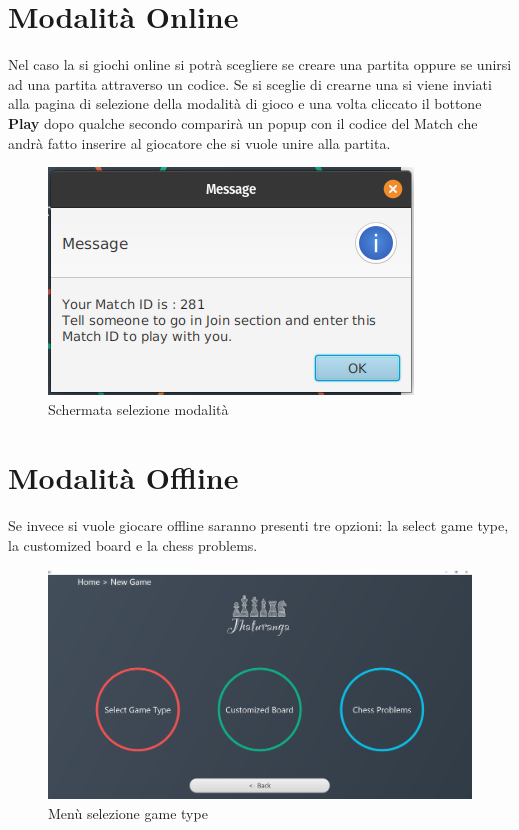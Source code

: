 \documentclass[a4paper,12pt]{report}
\begin{document}
\section{Modalità Online}
Nel caso la si giochi online si potrà scegliere se creare una partita oppure se unirsi ad una partita attraverso un codice.
Se si sceglie di crearne una si viene inviati alla pagina di selezione della modalità di gioco e una volta cliccato il bottone \textbf{Play} dopo qualche secondo comparirà un popup con il codice del Match che andrà fatto inserire al giocatore che si vuole unire alla partita.
\begin{figure}[H]
    \begin{center}
        \centering
        \includegraphics[scale=0.75]{img/guidaUtente/online_create_popup.png}
    \end{center}
    \caption{Schermata selezione modalità}
    \label{img:online_popup}
\end{figure}

\section{Modalità Offline}
Se invece si vuole giocare offline saranno presenti tre opzioni: la select game type, la customized board e la chess problems.

\begin{figure}[H]
    \begin{center}
        \centering
        \includegraphics[scale=0.25]{img/guidaUtente/sottomenuSelezine.png}
    \end{center}
    \caption{Menù selezione game type}
    \label{img:sottomenuSelezine}
\end{figure}
\end{document}
